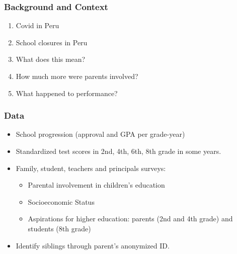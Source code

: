 \documentclass{beamer}
\begin{document}
\begin{frame}
    \label{frame:background}
    \frametitle{Background and Context}
    \begin{enumerate}
       \item Covid in Peru
       \item School closures in Peru
       \item What does this mean?
       \item How much more were parents involved?
       \item What happened to performance?
    \end{enumerate}
\end{frame}


\begin{frame}
    \label{frame:data}
    \frametitle{Data}

    \begin{itemize}
        \item School progression (approval and GPA per grade-year)
        \item Standardized test scores in 2nd, 4th, 6th, 8th grade in some years.
        \item Family, student, teachers and principals surveys:
        \begin{itemize}
            \item Parental involvement in children's education
            \item Socioeconomic Status
            \item Aspirations for higher education: parents (2nd and 4th grade) and students (8th grade)
        \end{itemize}
        \item Identify siblings through parent's anonymized ID.
    \end{itemize}
\end{frame}
\end{document}
